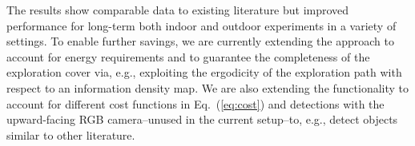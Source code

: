 \documentclass[lettersize,journal,twoside]{IEEEtran}
\theoremstyle{definition}
\begin{document}
The results show comparable data to existing literature but improved performance for long-term both indoor and outdoor experiments in a variety of settings. To enable further savings, we are currently extending the approach to account for energy requirements and to guarantee the completeness of the exploration cover via, e.g., exploiting the ergodicity of the exploration path with respect to an information density map.
We are also extending the functionality to account for different cost functions in Eq.~(\ref{eq:cost}) and detections with the upward-facing RGB camera--unused in the current setup--to, e.g., detect objects similar to other literature. %








\end{document}
